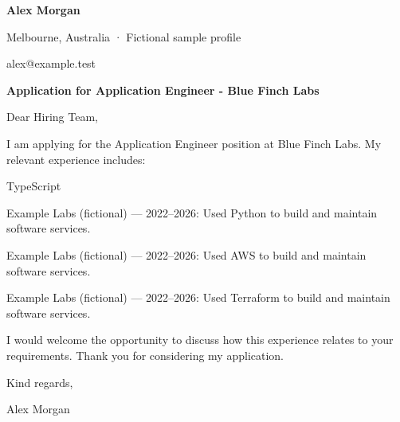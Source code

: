 \documentclass[10pt,a4paper]{article}
\begin{document}
{\LARGE\bfseries\color{navy} Alex Morgan}\par
Melbourne, Australia · Fictional sample profile\par
alex@example.test\par
{\large\bfseries\color{navy} Application for Application Engineer - Blue Finch Labs}\par
Dear Hiring Team,\par
I am applying for the Application Engineer position at Blue Finch Labs. My relevant experience includes:\par
TypeScript\par
Example Labs (fictional) — 2022–2026: Used Python to build and maintain software services.\par
Example Labs (fictional) — 2022–2026: Used AWS to build and maintain software services.\par
Example Labs (fictional) — 2022–2026: Used Terraform to build and maintain software services.\par
I would welcome the opportunity to discuss how this experience relates to your requirements. Thank you for considering my application.\par
Kind regards,\par
Alex Morgan\par
\end{document}
